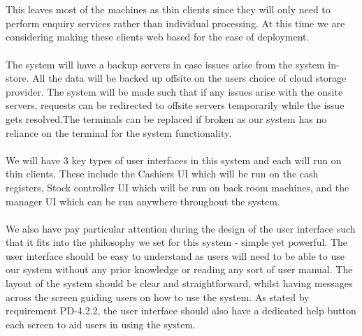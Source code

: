 \documentclass[a4paper]{article}
\begin{document}
\\\\
This leaves most of the machines as thin clients since they will only need to perform enquiry services rather than individual processing. At this time we are considering making these clients web based for the ease of deployment. 
\\\\
The system will have a backup servers in case issues arise from the system in-store. All the data will be backed up offsite on the users choice of cloud storage provider. The system will be made such that if any issues arise with the onsite servers, requests can be redirected to offsite servers temporarily while the issue gets resolved.The terminals can be replaced if broken as our system has no reliance on the terminal for the system functionality. 
\\\\
We will have 3 key types of user interfaces in this system and each will run on thin clients. These include the Cashiers UI which will be run on the cash registers, Stock controller UI which will be run on back room machines, and the manager UI which can be run anywhere throughout the system. 
\\\\
We also have pay particular attention during the design of the user interface such that it fits into the philosophy we set for this system - simple yet powerful. The user interface should be easy to understand as users will need to be able to use our system without any prior knowledge or reading any sort of user manual. The layout of the system should be clear and straightforward, whilst having messages across the screen guiding users on how to use the system. As stated by requirement PD-4.2.2, the user interface should also have a dedicated help button each screen to aid users in using the system.
\pagebreak
\end{document}
